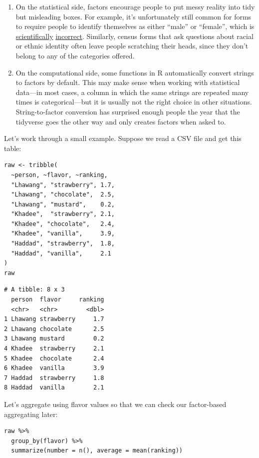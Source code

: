 \begin{enumerate}
\item
  On the statistical side,
  factors encourage people to put messy reality into tidy but misleading boxes.
  For example,
  it's unfortunately still common for forms to require people to identify themselves
  as either ``male'' or ``female'',
  which is \href{https://www.quora.com/Scientifically-how-many-sexes-genders-are-there}{scientifically}
  \href{https://www.joshuakennon.com/the-six-common-biological-sexes-in-humans/}{incorrect}.
  Similarly,
  census forms that ask questions about racial or ethnic identity often leave people scratching their heads,
  since they don't belong to any of the categories offered.
\item
  On the computational side,
  some functions in R automatically convert strings to factors by default.
  This may make sense when working with statistical data---in most cases,
  a column in which the same strings are repeated many times is categorical---but
  it is usually not the right choice in other situations.
  String-to-factor conversion has surprised enough people the year that
  the tidyverse goes the other way and only creates factors when asked to.
\end{enumerate}

Let's work through a small example.
Suppose we read a CSV file and get this table:

\begin{lstlisting}
raw <- tribble(
  ~person, ~flavor, ~ranking,
  "Lhawang", "strawberry", 1.7,
  "Lhawang", "chocolate",  2.5,
  "Lhawang", "mustard",    0.2,
  "Khadee",  "strawberry", 2.1,
  "Khadee", "chocolate",   2.4,
  "Khadee", "vanilla",     3.9,
  "Haddad", "strawberry",  1.8,
  "Haddad", "vanilla",     2.1
)
raw
\end{lstlisting}

\begin{lstlisting}
# A tibble: 8 x 3
  person  flavor     ranking
  <chr>   <chr>        <dbl>
1 Lhawang strawberry     1.7
2 Lhawang chocolate      2.5
3 Lhawang mustard        0.2
4 Khadee  strawberry     2.1
5 Khadee  chocolate      2.4
6 Khadee  vanilla        3.9
7 Haddad  strawberry     1.8
8 Haddad  vanilla        2.1
\end{lstlisting}

\noindent
Let's aggregate using flavor values
so that we can check our factor-based aggregating later:

\begin{lstlisting}
raw %>%
  group_by(flavor) %>%
  summarize(number = n(), average = mean(ranking))
\end{lstlisting}

